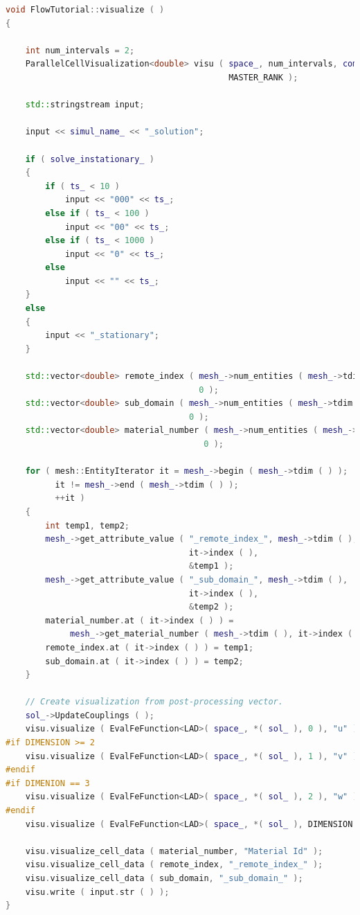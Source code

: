 \documentclass[a4paper, 11pt, twoside]{article}
\begin{document}
\begin{lstlisting}[language=C++, basicstyle={\footnotesize, \ttfamily}, keywordstyle=\color{blue},  numbers=none, tabsize=4]
void FlowTutorial::visualize ( )
{

    int num_intervals = 2;
    ParallelCellVisualization<double> visu ( space_, num_intervals, comm_, 
                                             MASTER_RANK );

    std::stringstream input;

    input << simul_name_ << "_solution";

    if ( solve_instationary_ )
    {
        if ( ts_ < 10 )
            input << "000" << ts_;
        else if ( ts_ < 100 )
            input << "00" << ts_;
        else if ( ts_ < 1000 )
            input << "0" << ts_;
        else
            input << "" << ts_;
    }
    else
    {
        input << "_stationary";
    }

    std::vector<double> remote_index ( mesh_->num_entities ( mesh_->tdim ( ) ), 
                                       0 );
    std::vector<double> sub_domain ( mesh_->num_entities ( mesh_->tdim ( ) ), 
                                     0 );
    std::vector<double> material_number ( mesh_->num_entities ( mesh_->tdim ( ) ), 
                                        0 );

    for ( mesh::EntityIterator it = mesh_->begin ( mesh_->tdim ( ) );
          it != mesh_->end ( mesh_->tdim ( ) );
          ++it )
    {
        int temp1, temp2;
        mesh_->get_attribute_value ( "_remote_index_", mesh_->tdim ( ),
                                     it->index ( ),
                                     &temp1 );
        mesh_->get_attribute_value ( "_sub_domain_", mesh_->tdim ( ),
                                     it->index ( ),
                                     &temp2 );
        material_number.at ( it->index ( ) ) = 
             mesh_->get_material_number ( mesh_->tdim ( ), it->index ( ) );
        remote_index.at ( it->index ( ) ) = temp1;
        sub_domain.at ( it->index ( ) ) = temp2;
    }

    // Create visualization from post-processing vector.
    sol_->UpdateCouplings ( );
    visu.visualize ( EvalFeFunction<LAD>( space_, *( sol_ ), 0 ), "u" );
#if DIMENSION >= 2
    visu.visualize ( EvalFeFunction<LAD>( space_, *( sol_ ), 1 ), "v" );
#endif
#if DIMENION == 3
    visu.visualize ( EvalFeFunction<LAD>( space_, *( sol_ ), 2 ), "w" );
#endif
    visu.visualize ( EvalFeFunction<LAD>( space_, *( sol_ ), DIMENSION ), "p" );

    visu.visualize_cell_data ( material_number, "Material Id" );
    visu.visualize_cell_data ( remote_index, "_remote_index_" );
    visu.visualize_cell_data ( sub_domain, "_sub_domain_" );
    visu.write ( input.str ( ) );
}

\end{lstlisting}
\end{document}
